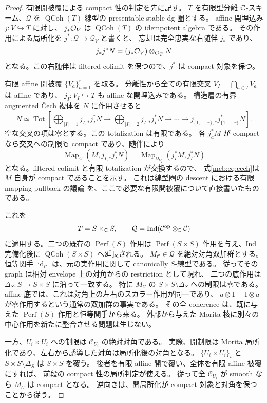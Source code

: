 \begin{proof}
有限開被覆による compact 性の判定を先に記す。
$T$ を有限型分離 $\mathbb C$-スキーム、$\mathcal Q$ を
$\operatorname{QCoh}(T)$-線型の presentable stable dg 圏とする。
affine 開埋込み $j:V\hookrightarrow T$ に対し、
$j_*\mathcal O_V$ は $\operatorname{QCoh}(T)$ の idempotent algebra である。
その作用による局所化を $j^*:\mathcal Q\to\mathcal Q_V$ と書くと、
忘却は完全忠実な右随伴 $j_*$ であり、
\[
             j_*j^*N=(j_*\mathcal O_V)\otimes_{\mathcal O_T}N
\]
となる。この右随伴は filtered colimit を保つので、$j^*$ は compact 対象を保つ。

有限 affine 開被覆 $\{V_a\}_{a=1}^r$ を取る。
分離性から全ての有限交叉 $V_I=\bigcap_{a\in I}V_a$ は affine であり、
$j_I:V_I\hookrightarrow T$ も affine な開埋込みである。
構造層の有界 augmented \v{C}ech 複体を $N$ に作用させると
\begin{equation}\label{mcb:eq:cech}
 N\simeq\operatorname{Tot}\left[
   \bigoplus_{|I|=1}j_{I,*}j_I^*N\longrightarrow
   \bigoplus_{|I|=2}j_{I,*}j_I^*N\longrightarrow\cdots
   \longrightarrow j_{\{1,\ldots,r\},*}j_{\{1,\ldots,r\}}^*N
                         \right].
\end{equation}
空な交叉の項は零とする。この totalization は有限である。
各 $j_a^*M$ が compact なら交叉への制限も compact であり、随伴により
\[
 \operatorname{Map}_{\mathcal Q}(M,j_{I,*}j_I^*N)
   =\operatorname{Map}_{\mathcal Q_{V_I}}(j_I^*M,j_I^*N)
\]
となる。filtered colimit と有限 totalization が交換するので、
式\eqref{mcb:eq:cech}は $M$ 自身が compact であることを示す。
これは線型圏の descent における有限 mapping pullback の議論
\cite[Lemma~6.4 and proof of Theorem~6.11, pp.~1222--1223]{CMOAntieauGepnerDescent}
を、ここで必要な有限開被覆について直接書いたものである。

これを
\[
 T=S\times_\mathbb C S,\qquad
 \mathcal Q=\operatorname{Ind}
                (\mathcal C^{\mathrm{op}}\otimes_\mathbb C\mathcal C)
\]
に適用する。二つの既存の $\operatorname{Perf}(S)$ 作用は
$\operatorname{Perf}(S\times S)$ 作用を与え、Ind 完備化後に
$\operatorname{QCoh}(S\times S)$ へ延長される。
$M_{\mathcal C}\in\mathcal Q$ を絶対対角双加群とする。
恒等関手 $\operatorname{id}_{\mathcal C}$ は、元の実作用に関して
canonically $S$-線型である。
従ってその graph は相対 envelope 上の対角からの restriction として現れ、
二つの底作用は $\Delta_S:S\to S\times S$ に沿って一致する。
特に $M_{\mathcal C}$ の $S\times S\setminus\Delta_S$ への制限は零である。
affine 底では、これは対角上の左右のスカラー作用が同一であり、
$a\otimes1-1\otimes a$ が零作用するという通常の双加群の事実である。
その全 coherence は、既に与えた $\operatorname{Perf}(S)$ 作用と恒等関手から来る。
外部から与えた Morita 核に別々の中心作用を新たに整合させる問題は生じない。

一方、$U_i\times U_i$ への制限は
$\mathcal C_{U_i}$ の絶対対角である。
実際、開制限は Morita 局所化であり、左右から誘導した対角は局所化後の対角となる。
$\{U_i\times U_i\}_i$ と $S\times S\setminus\Delta_S$ は $S\times S$ を覆う。
後者を有限 affine 開で覆い、全体を有限 affine 被覆にすれば、
前段の compact 性の局所判定が使える。
従って全 $\mathcal C_{U_i}$ が smooth なら $M_{\mathcal C}$ は compact となる。
逆向きは、開局所化が compact 対象と対角を保つことから従う。
\end{proof}

